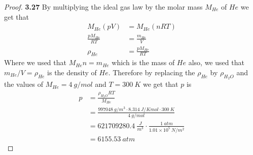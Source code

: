 \documentclass[11pt]{article}
\theoremstyle{definition}
\begin{document}
\cleardoublepage
\begin{proof}{\textbf{3.27}}
    By multiplying the ideal gas law by the molar mass $M_{He}$ of $He$
    we get that
    \begin{align*}
        M_{He}(pV) &= M_{He}(n R T)\\
        \frac{pM_{He}}{RT} &= \frac{m_{He}}{V}\\
        \rho_{He} &= \frac{pM_{He}}{RT}
    \end{align*}
    Where we used that $M_{He}n = m_{He}$ which is the mass of $He$
    also, we used that $m_{He}/V = \rho_{He}$ is the density of $He$.
    Therefore by replacing the $\rho_{He}$ by $\rho_{H_2O}$ and the values of
    $M_{He} = 4~g/mol$ and $T = 300~K$ we get that $p$ is
    \begin{align*}
        p &= \frac{\rho_{H_2O}RT}{M_{He}}\\
        &= \frac{ 997048 ~g/m^3 \cdot 8.314~J/K mol \cdot 300~K}{4~g/mol}\\
        &= 621709280.4~\frac{J}{m^3} \cdot \frac{1~atm}{1.01 \times 10^5~N/m^2}\\
        &= 6155.53~atm
    \end{align*}
\end{proof}
\cleardoublepage
\end{document}

